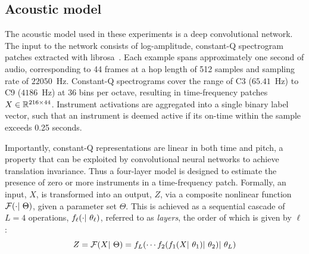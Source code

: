 \documentclass{article}
\begin{document}
\subsection{Acoustic model}

%
%

The acoustic model used in these experiments is a deep convolutional network.
The input to the network consists of log-amplitude, constant-Q spectrogram patches extracted with librosa~\cite{librosa}.
Each example spans approximately one second of audio, corresponding to 44 frames at a hop length of 512 samples and sampling rate of $22050$~Hz.
Constant-Q spectrograms cover the range of C3 ($65.41$~Hz) to C9 ($4186$~Hz) at 36 bins
per octave, resulting in time-frequency patches $X \in \mathbb{R}^{216\times44}$.
Instrument activations are aggregated into a single binary label vector, such that an instrument is deemed active if its on-time within the sample exceeds 0.25 seconds.

Importantly, constant-Q representations are linear in both time and pitch, a property that can be exploited by convolutional neural networks to achieve translation invariance.
Thus a four-layer model is designed to estimate the presence of zero or more instruments in a time-frequency patch.
Formally, an input, $X$, is transformed into an output, $Z$, via a composite nonlinear
function $\mathcal{F}(\cdot |~ \Theta)$, given a parameter set $\Theta$.
This is achieved as a sequential cascade of $L=4$ operations, $f_\ell(\cdot |~
\theta_\ell)$, referred to as \emph{layers}, the order of which is given by $\ell$:
\begin{equation}
\label{eq:layers}
Z = \mathcal{F}(X |~ \Theta) = f_{L}(  \cdots f_2(f_1(X |~ \theta_1) |~ \theta_2) |~ \theta_{L})
\end{equation}
\end{document}

